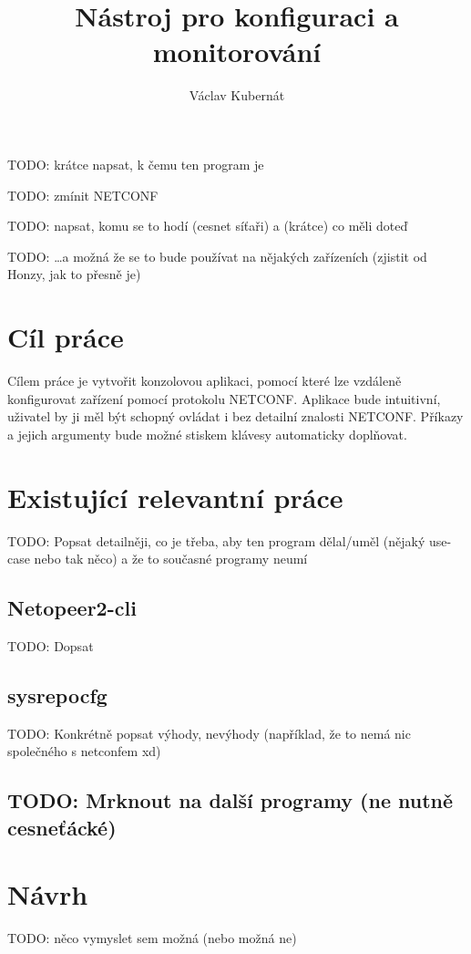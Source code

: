 \documentclass[thesis=B,czech]{FITthesis}[2019/03/06]
\title{Nástroj pro konfiguraci a monitorování}
\author{Václav Kubernát}
\begin{document}

\begin{introduction}
TODO: krátce napsat, k čemu ten program je

TODO: zmínit NETCONF

TODO: napsat, komu se to hodí (cesnet síťaři) a (krátce) co měli doteď

TODO: \ldots a možná že se to bude používat na nějakých zařízeních (zjistit od Honzy, jak to přesně je)
\end{introduction}


\chapter{Cíl práce} 
Cílem práce je vytvořit konzolovou aplikaci, pomocí které lze vzdáleně konfigurovat zařízení pomocí protokolu NETCONF\@. Aplikace bude intuitivní, uživatel by ji měl být schopný ovládat i bez detailní znalosti NETCONF\@. Příkazy a jejich argumenty bude možné stiskem klávesy automaticky doplňovat.


\chapter{Existující relevantní práce}
TODO: Popsat detailněji, co je třeba, aby ten program dělal/uměl (nějaký use-case nebo tak něco) a že to současné programy neumí
\section{Netopeer2-cli}
TODO: Dopsat
\section{sysrepocfg}
TODO: Konkrétně popsat výhody, nevýhody (například, že to nemá nic společného s netconfem xd)
\section{TODO: Mrknout na další programy (ne nutně cesneťácké)}


\chapter{Návrh}
TODO: něco vymyslet sem možná (nebo možná ne)
\end{document}
